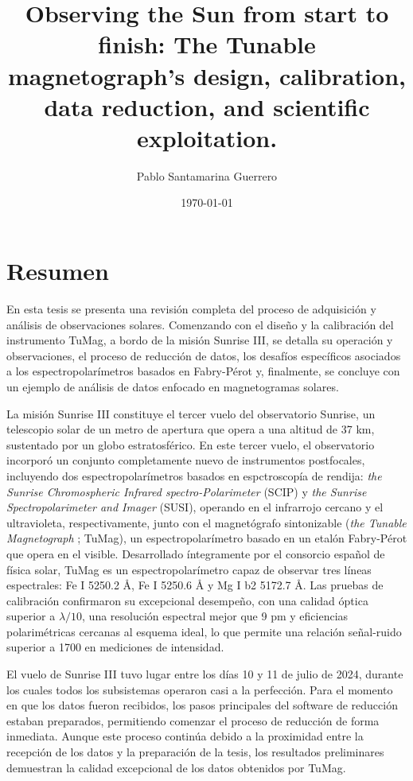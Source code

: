 \documentclass[12pt]{mythesis}
\title{Observing the Sun from start to finish: The Tunable magnetograph's design, calibration, data reduction, and scientific exploitation.}
\author{Pablo Santamarina Guerrero}
\date{\today}
\begin{document}
\frontmatter %
\maketitle
\cleardoublepage



\chapter*{Resumen}

En esta tesis se presenta una revisión completa del proceso de adquisición y análisis de observaciones solares. Comenzando con el diseño y la calibración del instrumento TuMag, a bordo de la misión Sunrise III, se detalla su operación y observaciones, el proceso de reducción de datos, los desafíos específicos asociados a los espectropolarímetros basados en Fabry-Pérot y, finalmente, se concluye con un ejemplo de análisis de datos enfocado en magnetogramas solares.

La misión Sunrise III constituye el tercer vuelo del observatorio Sunrise, un telescopio solar de un metro de apertura que opera a una altitud de 37 km, sustentado por un globo estratosférico. En este tercer vuelo, el observatorio incorporó un conjunto completamente nuevo de instrumentos postfocales, incluyendo dos espectropolarímetros basados en espctroscopía de rendija: \textit{the Sunrise Chromospheric Infrared spectro-Polarimeter} (SCIP) y \textit{the Sunrise Spectropolarimeter and Imager} (SUSI), operando en el infrarrojo cercano y el ultravioleta, respectivamente, junto con el magnetógrafo sintonizable (\textit{the Tunable Magnetograph} ; TuMag), un espectropolarímetro basado en un etalón Fabry-Pérot que opera en el visible. Desarrollado íntegramente por el consorcio español de física solar, TuMag es un espectropolarímetro capaz de observar tres líneas espectrales: Fe I 5250.2 Å, Fe I 5250.6 Å y Mg I b2 5172.7 Å. Las pruebas de calibración confirmaron su excepcional desempeño, con una calidad óptica superior a $\lambda/10$, una resolución espectral mejor que 9 pm y eficiencias polarimétricas cercanas al esquema ideal, lo que permite una relación señal-ruido superior a 1700 en mediciones de intensidad.

El vuelo de Sunrise III tuvo lugar entre los días 10 y 11 de julio de 2024, durante los cuales todos los subsistemas operaron casi a la perfección. Para el momento en que los datos fueron recibidos, los pasos principales del software de reducción estaban preparados, permitiendo comenzar el proceso de reducción de forma inmediata. Aunque este proceso continúa debido a la proximidad entre la recepción de los datos y la preparación de la tesis, los resultados preliminares demuestran la calidad excepcional de los datos obtenidos por TuMag.
\end{document}
